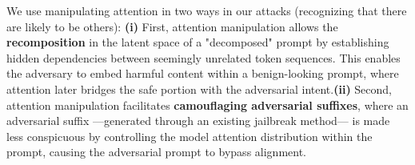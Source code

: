 We use manipulating attention in two ways in our attacks (recognizing that there are likely to be others): \textbf{(i)} First, attention manipulation allows the \textbf{recomposition} in the latent space of a "decomposed" prompt by establishing hidden dependencies between seemingly unrelated token sequences. This enables the adversary to embed harmful content within a benign-looking prompt, where attention later bridges the safe portion with the adversarial intent.\textbf{(ii)} Second, attention manipulation facilitates \textbf{camouflaging adversarial suffixes}, where an adversarial suffix —generated through an existing jailbreak method— is made less conspicuous by controlling the model attention distribution within the prompt, causing the adversarial prompt to bypass alignment. 


